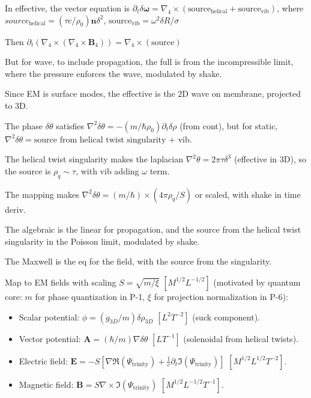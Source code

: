 In effective, the vector equation is $\partial_t \delta\boldsymbol{\omega} = \nabla_4 \times (\text{source}_{\text{helical}} + \text{source}_{\text{vib}})$, where $source_{\text{helical}} = (\tau c / \rho_0) \mathbf{n} \delta^2$, $\text{source}_\text{vib} = \omega^2 \delta R / \sigma$

Then $\partial_t (\nabla_4 \times (\nabla_4 \times \mathbf{B}_4)) = \nabla_4 \times (\text{source})$

But for wave, to include propagation, the full is from the incompressible limit, where the pressure enforces the wave, modulated by shake.

Since EM is surface modes, the effective is the 2D wave on membrane, projected to 3D.

The phase $\delta\theta$ satisfies $\nabla^2 \delta\theta = - (m / \hbar \rho_0) \partial_t \delta\rho$ (from cont), but for static, $\nabla^2 \delta\theta = \text{source from helical twist singularity + vib}$.

The helical twist singularity makes the laplacian $\nabla^2 \theta = 2\pi \tau \delta^3$ (effective in 3D), so the source is $\rho_q \sim \tau$, with vib adding $\omega$ term.

The mapping makes $\nabla^2 \delta\theta = (m / \hbar) \times (4\pi \rho_q / S)$ or scaled, with shake in time deriv.

The algebraic is the linear for propagation, and the source from the helical twist singularity in the Poisson limit, modulated by shake.

The Maxwell is the eq for the field, with the source from the singularity.

Map to EM fields with scaling $S = \sqrt{m / \xi}$ $[M^{1/2} L^{-1/2}]$ (motivated by quantum core: $m$ for phase quantization in P-1, $\xi$ for projection normalization in P-6):

\begin{itemize}
\item Scalar potential: $\phi = (g_{3D} / m) \delta \rho_{3D}$ $[L^2 T^{-2}]$ (suck component).
\item Vector potential: $\mathbf{A} = (\hbar / m) \nabla \delta \theta$ $[L T^{-1}]$ (solenoidal from helical twists).
\item Electric field: $\mathbf{E} = -S \left[ \nabla \Re(\Psi_{\text{trinity}}) + \frac{1}{c} \partial_t \Im(\Psi_{\text{trinity}}) \right]$ $[M^{1/2} L^{1/2} T^{-2}]$.
\item Magnetic field: $\mathbf{B} = S \nabla \times \Im(\Psi_{\text{trinity}})$ $[M^{1/2} L^{-1/2} T^{-1}]$.
\end{itemize}

